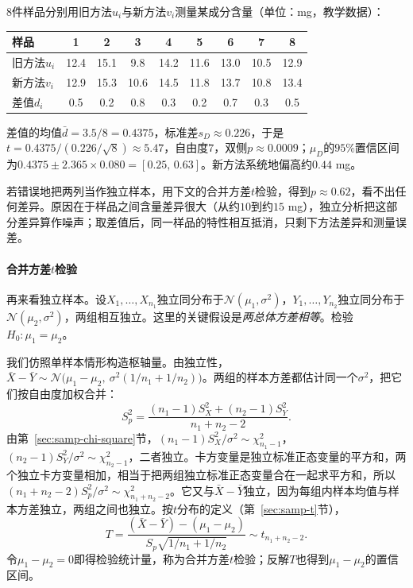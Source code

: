 \begin{example}[配对设计与错误的独立分析]
\label{ex:pred-paired}
$8$件样品分别用旧方法$u_i$与新方法$v_i$测量某成分含量（单位：mg，教学数据）：
\begin{center}
\begin{tabular}{lcccccccc}
  \toprule
  样品 & 1 & 2 & 3 & 4 & 5 & 6 & 7 & 8\\
  \midrule
  旧方法$u_i$ & 12.4 & 15.1 & 9.8 & 14.2 & 11.6 & 13.0 & 10.5 & 12.9\\
  新方法$v_i$ & 12.9 & 15.3 & 10.6 & 14.5 & 11.8 & 13.7 & 10.8 & 13.4\\
  差值$d_i$ & 0.5 & 0.2 & 0.8 & 0.3 & 0.2 & 0.7 & 0.3 & 0.5\\
  \bottomrule
\end{tabular}
\end{center}
差值的均值$\bar d=3.5/8=0.4375$，标准差$s_D\approx0.226$，于是$t=0.4375/(0.226/\sqrt8)\approx5.47$，自由度$7$，双侧$p\approx0.0009$；$\mu_D$的$95\%$置信区间为$0.4375\pm2.365\times0.080=[0.25,\,0.63]$。新方法系统地偏高约$0.44$ mg。

若错误地把两列当作独立样本，用下文的合并方差$t$检验，得到$p\approx0.62$，看不出任何差异。原因在于样品之间含量差异很大（从约$10$到约$15$ mg），独立分析把这部分差异算作噪声；取差值后，同一样品的特性相互抵消，只剩下方法差异和测量误差。
\end{example}

\paragraph{合并方差$t$检验}

再来看独立样本。设$X_1,\dots,X_{n_1}$独立同分布于$\mathcal N(\mu_1,\sigma^2)$，$Y_1,\dots,Y_{n_2}$独立同分布于$\mathcal N(\mu_2,\sigma^2)$，两组相互独立。这里的关键假设是\emph{两总体方差相等}。检验$H_0:\mu_1=\mu_2$。

我们仿照单样本情形构造枢轴量。由独立性，$\bar X-\bar Y\sim\mathcal N\bigl(\mu_1-\mu_2,\ \sigma^2(1/n_1+1/n_2)\bigr)$。两组的样本方差都估计同一个$\sigma^2$，把它们按自由度加权合并：
\[
 S_p^2=\frac{(n_1-1)S_X^2+(n_2-1)S_Y^2}{n_1+n_2-2}.
\]
由第~\ref{sec:samp-chi-square}节，$(n_1-1)S_X^2/\sigma^2\sim\chi^2_{n_1-1}$，$(n_2-1)S_Y^2/\sigma^2\sim\chi^2_{n_2-1}$，二者独立。卡方变量是独立标准正态变量的平方和，两个独立卡方变量相加，相当于把两组独立标准正态变量合在一起求平方和，所以$(n_1+n_2-2)S_p^2/\sigma^2\sim\chi^2_{n_1+n_2-2}$。它又与$\bar X-\bar Y$独立，因为每组内样本均值与样本方差独立，两组之间也独立。按$t$分布的定义（第~\ref{sec:samp-t}节），
\begin{equation}
 T=\frac{(\bar X-\bar Y)-(\mu_1-\mu_2)}{S_p\sqrt{1/n_1+1/n_2}}\sim t_{n_1+n_2-2}.
 \label{eq:pred-pooled-t}
\end{equation}
令$\mu_1-\mu_2=0$即得检验统计量，称为合并方差$t$检验；反解$T$也得到$\mu_1-\mu_2$的置信区间。

